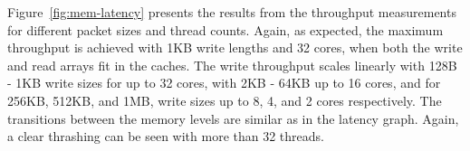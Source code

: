Figure~\ref{fig:mem-latency} presents the results from the throughput measurements for different packet sizes and thread counts. Again, as expected, the maximum throughput is achieved with 1KB write lengths and 32 cores, when both the write and read arrays fit in the caches. The write throughput scales linearly with 128B - 1KB write sizes for up to 32 cores, with 2KB - 64KB up to 16 cores, and for 256KB, 512KB, and 1MB, write sizes up to 8, 4, and 2 cores respectively. The transitions between the memory levels are similar as in the latency graph. Again, a clear thrashing can be seen with more than 32 threads.


